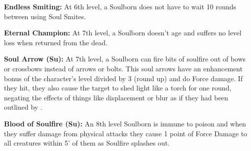 \textbf{Endless Smiting:} At 6th level, a Soulborn does not have to wait 10 rounds between using Soul Smites.

\textbf{Eternal Champion:} At 7th level, a Soulborn doesn't age and suffers no level loss when returned from the dead.

\textbf{Soul Arrow (Su):} At 7th level, a Soulborn can fire bits of soulfire out of bows or crossbows instead of arrows or bolts. This soul arrows have an enhancement bonus of the character's level divided by 3 (round up) and do Force damage. If they hit, they also cause the target to shed light like a torch for one round, negating the effects of things like displacement or blur as if they had been outlined by .

\textbf{Blood of Soulfire (Su):} An 8th level Soulborn is immune to poison and when they suffer damage from physical attacks they cause 1 point of Force Damage to all creatures within 5' of them as Soulfire splashes out.

